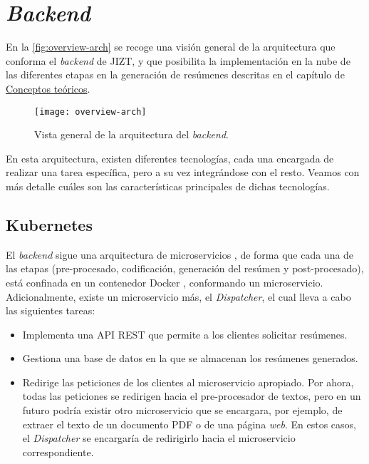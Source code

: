 \section{\emph{Backend}} \label{sec:backend}

En la \autoref{fig:overview-arch} se recoge una visión general de la arquitectura que conforma el \emph{backend} de JIZT, y que posibilita la implementación en la nube de las diferentes etapas en la generación de resúmenes descritas en el capítulo de \hyperref[chapter:conceptos]{Conceptos teóricos}.

\begin{figure}[!h]
	\centering
	\texttt{[image: overview-arch]}
	\caption{Vista general de la arquitectura del \emph{backend}.}
	\label{fig:overview-arch}
\end{figure}

En esta arquitectura, existen diferentes tecnologías, cada una encargada de realizar una tarea específica, pero a su vez integrándose con el resto. Veamos con más detalle cuáles son las características principales de dichas tecnologías.

\subsection{Kubernetes}

El \emph{backend} sigue una arquitectura de microservicios \cite{newman15}, de forma que cada una de las etapas (pre-procesado, codificación, generación del resúmen y post-procesado), está confinada en un contenedor Docker \cite{docker}, conformando un microservicio. Adicionalmente, existe un microservicio más, el \emph{Dispatcher}, el cual lleva a cabo las siguientes tareas:

\vspace{-0.5cm}
\begin{itemize}
	\item [\textbullet] Implementa una API REST que permite a los clientes solicitar resúmenes.
	\item [\textbullet] Gestiona una base de datos en la que se almacenan los resúmenes generados.
	\item [\textbullet] Redirige las peticiones de los clientes al microservicio apropiado. Por ahora, todas las peticiones se redirigen hacia el pre-procesador de textos, pero en un futuro podría existir otro microservicio que se encargara, por ejemplo, de extraer el texto de un documento PDF o de una página \emph{web}. En estos casos, el \emph{Dispatcher} se encargaría de redirigirlo hacia el microservicio correspondiente.
\end{itemize}

